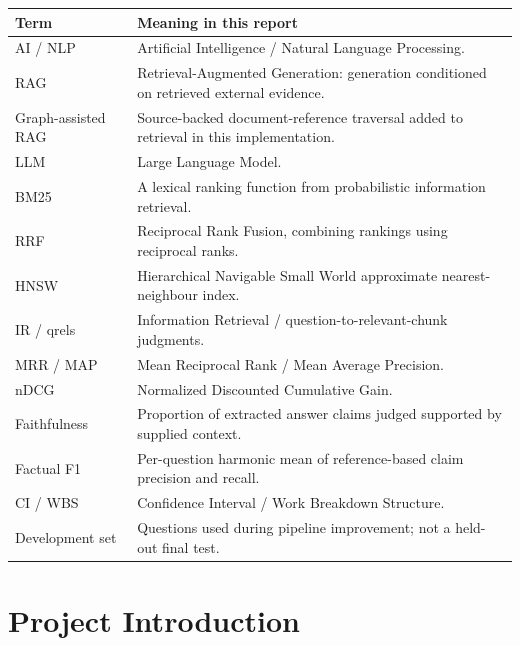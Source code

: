 \documentclass[11pt,a4paper,oneside]{report}
\newenvironment{reporttable}{\begin{center}\small}{\end{center}}
\begin{document}
\par\bigskip{}\par
{}
\begin{reporttable}
\begin{tabularx}{\textwidth}{lY}
\toprule\textbf{Term} & \textbf{Meaning in this report}\\\midrule
AI / NLP & Artificial Intelligence / Natural Language Processing.\\
RAG & Retrieval-Augmented Generation: generation conditioned on retrieved external evidence.\\
Graph-assisted RAG & Source-backed document-reference traversal added to retrieval in this implementation.\\
LLM & Large Language Model.\\
BM25 & A lexical ranking function from probabilistic information retrieval.\\
RRF & Reciprocal Rank Fusion, combining rankings using reciprocal ranks.\\
HNSW & Hierarchical Navigable Small World approximate nearest-neighbour index.\\
IR / qrels & Information Retrieval / question-to-relevant-chunk judgments.\\
MRR / MAP & Mean Reciprocal Rank / Mean Average Precision.\\
nDCG & Normalized Discounted Cumulative Gain.\\
Faithfulness & Proportion of extracted answer claims judged supported by supplied context.\\
Factual F1 & Per-question harmonic mean of reference-based claim precision and recall.\\
CI / WBS & Confidence Interval / Work Breakdown Structure.\\
Development set & Questions used during pipeline improvement; not a held-out final test.\\
\bottomrule
\end{tabularx}
\end{reporttable}
\clearpage
\listoftables{}
\clearpage
\listoffigures{}
\clearpage
{}

\chapter{Project Introduction}\label{ch:introduction}
\end{document}
